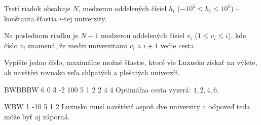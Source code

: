 Tretí riadok obsahuje $N$, medzerou oddelených čísiel $h_i$ ($-10^5 \leq h_i \leq 10^5$) --
konštanta šťastia $i$-tej univerzity.

Na poslednom riadku je $N-1$ medzerou oddelených čísiel $v_i$ ($1 \leq v_i \leq i$), kde číslo $v_i$ znamená, že medzi
univerzitami $v_i$ a $i+1$ vedie cesta.


Vypíšte jedno číslo, maximálne možné šťastie, ktoré vie Luxusko získať na výlete, ak navštívi
rovnako veľa chlpatých a plešatých univerzíť.



BWBBBW
6 0 3 -2 100 5
1 2 2 4 4
\sampleCOMMENT
Optimálna cesta vyzerá: $1,2,4,6$.
\sampleEND

\bigskip

WBW
1 -10 5
1 2
\sampleCOMMENT
Luxusko musí navštíviť aspoň dve univerzity a odpoveď teda môže byť aj záporná.
\sampleEND


